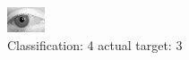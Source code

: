 \begin{figure}[h!]
\begin{center}
\includegraphics[width=0.60\columnwidth]{figures/ID2818_class_4_target_3.png}
\end{center}
\caption{ Classification: 4 actual target: 3}
\label{fig:ID2818_class_4_target_3}
\end{figure}
